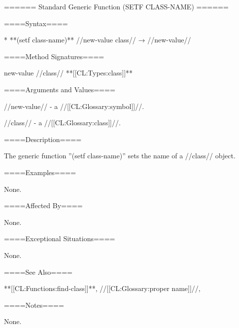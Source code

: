 ====== Standard Generic Function (SETF CLASS-NAME) ======

====Syntax====

  * **(setf class-name)** //new-value class// → //new-value//

====Method Signatures====

 {new-value //class// **[[CL:Types:class]]**}

====Arguments and Values====

//new-value// - a //[[CL:Glossary:symbol]]//.

//class// - a //[[CL:Glossary:class]]//.

====Description====

The generic function ''(setf class-name)'' sets the name of a //class// object.



====Examples====

None.

====Affected By====

None.

====Exceptional Situations====

None.

====See Also====

**[[CL:Functions:find-class]]**, //[[CL:Glossary:proper name]]//, {\secref\Classes}

====Notes====

None.




